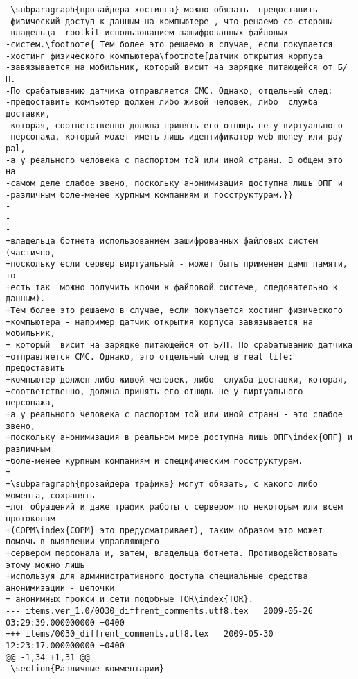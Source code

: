 \begin{verbatim}
 \subparagraph{провайдера хостинга} можно обязать  предоставить
 физический доступ к данным на компьютере , что решаемо со стороны
-владельца  rootkit использованием зашифрованных файловых
-систем.\footnote{ Тем более это решаемо в случае, если покупается
-хостинг физического компьютера\footnote{датчик открытия корпуса
-завязывается на мобильник, который висит на зарядке питающейся от Б/П.
-По срабатыванию датчика отправляется СМС. Однако, отдельный след:
-предоставить компьютер должен либо живой человек, либо  служба доставки,
-которая, соответственно должна принять его отнюдь не у виртуального
-персонажа, который может иметь лишь идентификатор web-money или pay-pal,
-а у реального человека с паспортом той или иной страны. В общем это на
-самом деле слабое звено, поскольку анонимизация доступна лишь ОПГ и
-различным боле-менее курпным компаниям и госструктурам.}}
-
-
-
+владельца ботнета использованием зашифрованных файловых систем (частично,
+поскольку если сервер виртуальный - может быть применен дамп памяти, то
+есть так  можно получить ключи к файловой системе, следовательно к данным).
+Тем более это решаемо в случае, если покупается хостинг физического
+компьютера - например датчик открытия корпуса завязывается на мобильник,
+ который  висит на зарядке питающейся от Б/П. По срабатыванию датчика
+отправляется СМС. Однако, это отдельный след в real life: предоставить
+компьютер должен либо живой человек, либо  служба доставки, которая,
+соответственно, должна принять его отнюдь не у виртуального персонажа,
+а у реального человека с паспортом той или иной страны - это слабое звено,
+поскольку анонимизация в реальном мире доступна лишь ОПГ\index{ОПГ} и различным
+боле-менее курпным компаниям и специфическим госструктурам.
+
+\subparagraph{провайдера трафика} могут обязать, с какого либо момента, сохранять
+лог обращений и даже трафик работы с сервером по некоторым или всем протоколам
+(СОРМ\index{СОРМ} это предусматривает), таким образом это может помочь в выявлении управляющего
+сервером персонала и, затем, владельца ботнета. Противодействовать этому можно лишь
+используя для административного доступа специальные средства анонимизации - цепочки
+ анонимных прокси и сети подобные TOR\index{TOR}.
--- items.ver_1.0/0030_diffrent_comments.utf8.tex	2009-05-26 03:29:39.000000000 +0400
+++ items/0030_diffrent_comments.utf8.tex	2009-05-30 12:23:17.000000000 +0400
@@ -1,34 +1,31 @@
 \section{Различные комментарии}


\end{verbatim}
